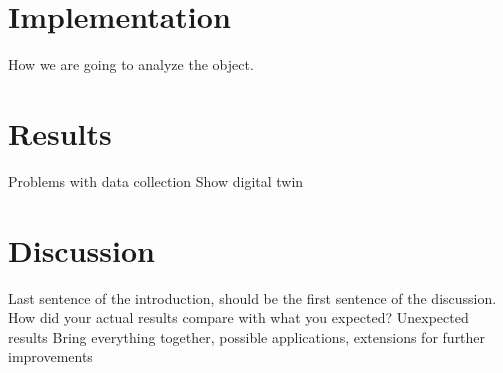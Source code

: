 \documentclass[conference]{IEEEtran}
\begin{document}
    \section{Implementation}\label{section:implementation}
    How we are going to analyze the object.
    \section{Results}\label{section:results}
    Problems with data collection
    Show digital twin
    \section{Discussion}\label{section:discussion}
    Last sentence of the introduction, should be the first sentence of the discussion.
    How did your actual results compare with what you expected?
    Unexpected results
    Bring everything together, possible applications, extensions for further improvements
    
    
    
\end{document}
